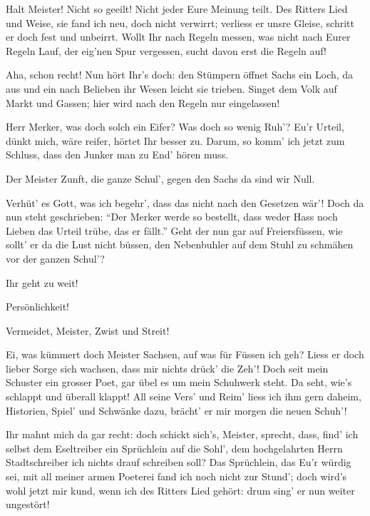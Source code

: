 \begin{drama}

Halt Meister! Nicht so geeilt!
Nicht jeder Eure Meinung teilt.
Des Ritters Lied und Weise,
sie fand ich neu, doch nicht verwirrt;
verliess er unsre Gleise,
schritt er doch fest und unbeirrt.
Wollt Ihr nach Regeln messen,
was nicht nach Eurer Regeln Lauf,
der eig'nen Spur vergessen,
sucht davon erst die Regeln auf!

\Beckmesserspeaks

Aha, schon recht! Nun hört Ihr's doch:
den Stümpern öffnet Sachs ein Loch,
da aus und ein nach Belieben
ihr Wesen leicht sie trieben.
Singet dem Volk auf Markt und Gassen;
hier wird nach den Regeln nur eingelassen!

\Sachsspeaks
Herr Merker, was doch solch ein Eifer?
Was doch so wenig Ruh'?
Eu'r Urteil, dünkt mich, wäre reifer,
hörtet Ihr besser zu.
Darum, so komm' ich jetzt zum Schluss,
dass den Junker man zu End' hören muss.

\Beckmesserspeaks
Der Meister Zunft, die ganze Schul',
gegen den Sachs da sind wir Null.

\Sachsspeaks
Verhüt' es Gott, was ich begehr',
dass das nicht nach den Gesetzen wär'!
Doch da nun steht geschrieben:
``Der Merker werde so bestellt,
dass weder Hass noch Lieben
das Urteil trübe, das er fällt.''
Geht der nun gar auf Freiersfüssen,
wie sollt' er da die Lust nicht büssen,
den Nebenbuhler auf dem Stuhl
zu schmähen vor der ganzen Schul'?



\Nachtigallspeaks
Ihr geht zu weit!

\Kothnerspeaks
Persönlichkeit!

\Pognerspeaks
Vermeidet, Meister, Zwist und Streit!

\Beckmesserspeaks
Ei, was kümmert doch Meister Sachsen,
auf was für Füssen ich geh?
Liess er doch lieber Sorge sich wachsen,
dass mir nichts drück' die Zeh'!
Doch seit mein Schuster ein grosser Poet,
gar übel es um mein Schuhwerk steht.
Da seht, wie's schlappt und überall klappt!
All seine Vers' und Reim' liess ich ihm gern daheim,
Historien, Spiel' und Schwänke dazu,
brächt' er mir morgen die neuen Schuh'!

\Sachsspeaks


Ihr mahnt mich da gar recht:
doch schickt sich's, Meister, sprecht,
dass, find' ich selbst dem Eseltreiber
ein Sprüchlein auf die Sohl',
dem hochgelahrten Herrn Stadtschreiber
ich nichts drauf schreiben soll?
Das Sprüchlein, das Eu'r würdig sei,
mit all meiner armen Poeterei
fand ich noch nicht zur Stund';
doch wird's wohl jetzt mir kund,
wenn ich des Ritters Lied gehört:
drum sing' er nun weiter ungestört!


\end{drama}
